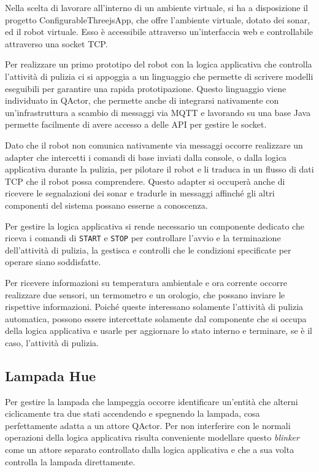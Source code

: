 Nella scelta di lavorare all'interno di un ambiente virtuale, si ha a disposizione il progetto ConfigurableThreejsApp, che offre l'ambiente virtuale, dotato dei sonar, ed il robot virtuale. Esso è accessibile attraverso un'interfaccia web e controllabile attraverso una socket TCP.

Per realizzare un primo prototipo del robot con la logica applicativa che controlla l'attività di pulizia ci si appoggia a un linguaggio che permette di scrivere modelli eseguibili per garantire una rapida prototipazione. Questo linguaggio viene individuato in QActor, che permette anche di integrarsi nativamente con un'infrastruttura a scambio di messaggi via MQTT e lavorando su una base Java permette facilmente di avere accesso a delle API per gestire le socket.

Dato che il robot non comunica nativamente via messaggi occorre realizzare un adapter che intercetti i comandi di base inviati dalla console, o dalla logica applicativa durante la pulizia, per pilotare il robot e li traduca in un flusso di dati TCP che il robot possa comprendere. Questo adapter si occuperà anche di ricevere le segnalazioni dei sonar e tradurle in messaggi affinché gli altri componenti del sistema possano esserne a conoscenza.

Per gestire la logica applicativa si rende necessario un componente dedicato che riceva i comandi di \texttt{START} e \texttt{STOP} per controllare l'avvio e la terminazione dell'attività di pulizia, la gestisca e controlli che le condizioni specificate per operare siano soddisfatte.

Per ricevere informazioni su temperatura ambientale e ora corrente occorre realizzare due sensori, un termometro e un orologio, che possano inviare le rispettive informazioni. Poiché queste interessano solamente l'attività di pulizia automatica, possono essere intercettate solamente dal componente che si occupa della logica applicativa e usarle per aggiornare lo stato interno e terminare, se è il caso, l'attività di pulizia.

\subsection{Lampada Hue}
Per gestire la lampada che lampeggia occorre identificare un'entità che alterni ciclicamente tra due stati accendendo e spegnendo la lampada, cosa perfettamente adatta a un attore QActor. Per non interferire con le normali operazioni della logica applicativa risulta conveniente modellare questo \textit{blinker} come un attore separato controllato dalla logica applicativa e che a sua volta controlla la lampada direttamente.

